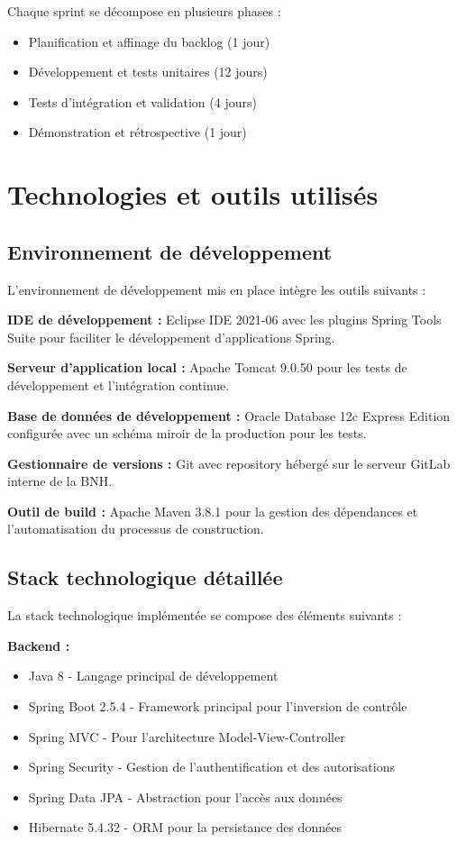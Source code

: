 Chaque sprint se décompose en plusieurs phases :
\begin{itemize}
    \item Planification et affinage du backlog (1 jour)
    \item Développement et tests unitaires (12 jours)
    \item Tests d'intégration et validation (4 jours)
    \item Démonstration et rétrospective (1 jour)
\end{itemize}

\section{Technologies et outils utilisés}

\subsection{Environnement de développement}

L'environnement de développement mis en place intègre les outils suivants :

\medskip

\textbf{IDE de développement :} Eclipse IDE 2021-06 avec les plugins Spring Tools Suite pour faciliter le développement d'applications Spring.

\textbf{Serveur d'application local :} Apache Tomcat 9.0.50 pour les tests de développement et l'intégration continue.

\textbf{Base de données de développement :} Oracle Database 12c Express Edition configurée avec un schéma miroir de la production pour les tests.

\textbf{Gestionnaire de versions :} Git avec repository hébergé sur le serveur GitLab interne de la BNH.

\textbf{Outil de build :} Apache Maven 3.8.1 pour la gestion des dépendances et l'automatisation du processus de construction.

\subsection{Stack technologique détaillée}

La stack technologique implémentée se compose des éléments suivants :

\medskip

\textbf{Backend :}
\begin{itemize}
    \item Java 8 - Langage principal de développement
    \item Spring Boot 2.5.4 - Framework principal pour l'inversion de contrôle
    \item Spring MVC - Pour l'architecture Model-View-Controller
    \item Spring Security - Gestion de l'authentification et des autorisations
    \item Spring Data JPA - Abstraction pour l'accès aux données
    \item Hibernate 5.4.32 - ORM pour la persistance des données
\end{itemize}

